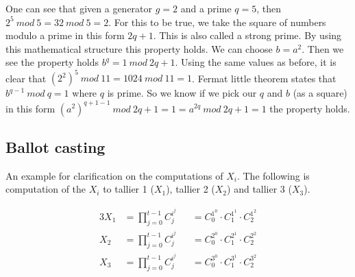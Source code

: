 \noindent
One can see that given a generator $g=2 $ and a prime $q=5$, then \begin{math}2^5 \ mod \ 5 = 32 \ mod \ 5 = 2\end{math}. For this to be true, we take the square of numbers modulo a prime in this form \begin{math}2q+1\end{math}. This is also called a strong prime. By using this mathematical structure this property holds. We can choose \begin{math}b=a^2\end{math}. Then we see the property holds \begin{math}b^{q} = 1 \ mod \ 2q+1\end{math}. Using the same values as before, it is clear that \begin{math}(2^2)^5 \ mod \ 11 = 1024 \ mod \ 11 = 1\end{math}. Fermat little theorem states that \begin{math}b^{q-1} \ mod \ q = 1\end{math} where \begin{math}q\end{math} is prime. So we know if we pick our \begin{math}q\end{math} and \begin{math}b\end{math} (as a square)  in this form \begin{math}(a^{2})^{q+1-1} \ mod \ 2q+1 =1 =  a^{2q} \ mod \ 2q+1 =1\end{math} the property holds.

\subsection{Ballot casting}
An example for clarification on the computations of \begin{math}X_i\end{math}. The following is computation of the $X_i$ to tallier 1 ($X_1$), tallier 2 ($X_2$) and tallier 3 ($X_3$).

\begin{alignat*}{3}
X_1 &=\prod\limits_{j=0}^{t-1} C_j^{i^j} &&= C_0^{1^0}  \cdot  C_1^{1^1}  \cdot  C_2^{1^2}\\
X_2 &=\prod\limits_{j=0}^{t-1} C_j^{i^j} &&= C_0^{2^0}  \cdot  C_1^{2^1}  \cdot  C_2^{2^2}\\
X_3 &=\prod\limits_{j=0}^{t-1} C_j^{i^j} &&= C_0^{3^0}  \cdot  C_1^{3^1}  \cdot  C_2^{3^2}
\end{alignat*}




